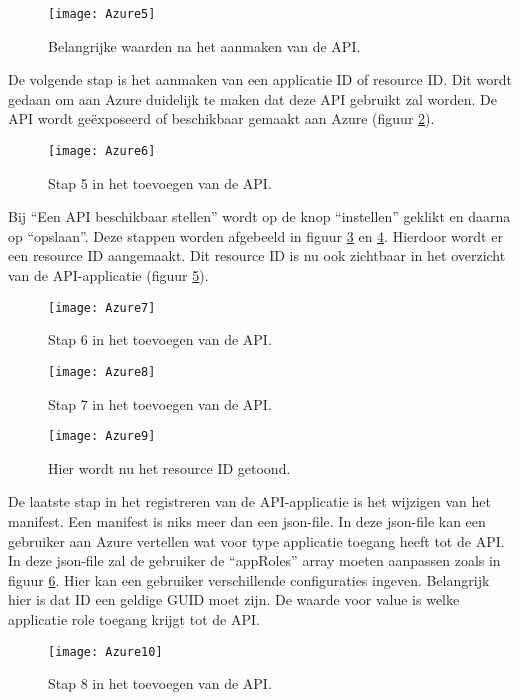 \begin{figure}[H]
	\centering
	\texttt{[image: Azure5]} 
	\caption[Azure5]{Belangrijke waarden na het aanmaken van de API.}
	\label{fig:azure5}
\end{figure} 
De volgende stap is het aanmaken van een applicatie ID of resource ID. Dit wordt gedaan om aan Azure duidelijk te maken dat deze API gebruikt zal worden. De API wordt geëxposeerd of beschikbaar gemaakt aan Azure (figuur \ref{fig:azure6}).
\begin{figure}[H]
	\centering
	\texttt{[image: Azure6]} 
	\caption[Azure6]{Stap 5 in het toevoegen van de API.}
	\label{fig:azure6}
\end{figure}
Bij “Een API beschikbaar stellen” wordt op de knop “instellen” geklikt en daarna op “opslaan”. Deze stappen worden afgebeeld in figuur \ref{fig:azure7} en \ref{fig:azure8}. Hierdoor wordt er een resource ID aangemaakt. Dit resource ID is nu ook zichtbaar in het overzicht van de API-applicatie (figuur \ref{fig:azure9}).
\begin{figure}[H]
	\centering
	\texttt{[image: Azure7]} 
	\caption[Azure7]{Stap 6 in het toevoegen van de API.}
	\label{fig:azure7}
\end{figure}
\begin{figure}[H]
	\centering
	\texttt{[image: Azure8]} 
	\caption[Azure8]{Stap 7 in het toevoegen van de API.}
	\label{fig:azure8}
\end{figure}
\begin{figure}[H]
	\centering
	\texttt{[image: Azure9]} 
	\caption[Azure9]{Hier wordt nu het resource ID getoond.}
	\label{fig:azure9}
\end{figure}\newpage
De laatste stap in het registreren van de API-applicatie is het wijzigen van het manifest. Een manifest is niks meer dan een json-file. In deze json-file kan een gebruiker aan Azure vertellen wat voor type applicatie toegang heeft tot de API. \newline
In deze json-file zal de gebruiker de “appRoles” array moeten aanpassen zoals in figuur \ref{fig:azure10}. Hier kan een gebruiker verschillende configuraties ingeven. Belangrijk hier is dat ID een geldige GUID moet zijn. De waarde voor value is welke applicatie role toegang krijgt tot de API.
\begin{figure}[H]
	\centering
	\texttt{[image: Azure10]} 
	\caption[Azure10]{Stap 8 in het toevoegen van de API.}
	\label{fig:azure10}
\end{figure}
